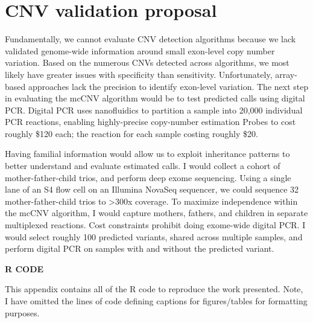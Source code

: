 \documentclass[11pt,letterpaper,oneside]{book}
\newcommand{\myonein}[1]{
\begin{center}
\bfseries\MakeUppercase{#1}
\end{center}
}
\begin{document}
\hypertarget{cnv-validation-proposal}{%
\section{CNV validation proposal}\label{cnv-validation-proposal}}

Fundamentally, we cannot evaluate CNV detection algorithms because we lack validated genome-wide information around small exon-level copy number variation.
Based on the numerous CNVs detected across algorithms, we most likely have greater issues with specificity than sensitivity.
Unfortunately, array-based approaches lack the precision to identify exon-level variation.
The next step in evaluating the mcCNV algorithm would be to test predicted calls using digital PCR.
Digital PCR uses nanofluidics to partition a sample into 20,000 individual PCR reactions, enabling highly-precise copy-number estimation
Probes to cost roughly \$120 each; the reaction for each sample costing roughly \$20.

Having familial information would allow us to exploit inheritance patterns to better understand and evaluate estimated calls.
I would collect a cohort of mother-father-child trios, and perform deep exome sequencing.
Using a single lane of an S4 flow cell on an Illumina NovaSeq sequencer, we could sequence 32 mother-father-child trios to \textgreater300x coverage.
To maximize independence within the mcCNV algorithm, I would capture mothers, fathers, and children in separate multiplexed reactions.
Cost constraints prohibit doing exome-wide digital PCR.
I would select roughly 100 predicted variants, shared across multiple samples, and perform digital PCR on samples with and without the predicted variant.

\hypertarget{appendix-appendix}{%
\appendix}


\backmatter
\singlespacing

\setlength{\parindent}{0ex}
\clearpage
{}
{}
\myonein{R CODE}

This appendix contains all of the R code to reproduce the work presented.
Note, I have omitted the lines of code defining captions for figures/tables for formatting purposes.
\end{document}
